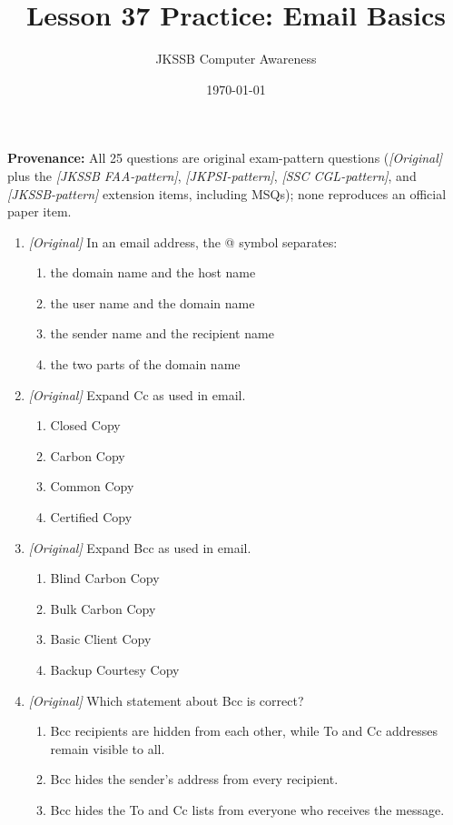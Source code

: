 \documentclass[11pt]{article}
\title{Lesson 37 Practice: Email Basics}
\author{JKSSB Computer Awareness}
\date{\today}
\begin{document}
\maketitle
\noindent\textbf{Provenance:} All 25 questions are original exam-pattern questions (\textit{[Original]} plus the \textit{[JKSSB FAA-pattern]}, \textit{[JKPSI-pattern]}, \textit{[SSC CGL-pattern]}, and \textit{[JKSSB-pattern]} extension items, including MSQs); none reproduces an official paper item.

\begin{enumerate}[label=\textbf{Q\arabic*.}, leftmargin=*]
\item \textit{[Original]} In an email address, the @ symbol separates:
  \begin{enumerate}[label=\Alph*.]
    \item the domain name and the host name
    \item the user name and the domain name
    \item the sender name and the recipient name
    \item the two parts of the domain name
  \end{enumerate}
\item \textit{[Original]} Expand Cc as used in email.
  \begin{enumerate}[label=\Alph*.]
    \item Closed Copy
    \item Carbon Copy
    \item Common Copy
    \item Certified Copy
  \end{enumerate}
\item \textit{[Original]} Expand Bcc as used in email.
  \begin{enumerate}[label=\Alph*.]
    \item Blind Carbon Copy
    \item Bulk Carbon Copy
    \item Basic Client Copy
    \item Backup Courtesy Copy
  \end{enumerate}
\item \textit{[Original]} Which statement about Bcc is correct?
  \begin{enumerate}[label=\Alph*.]
    \item Bcc recipients are hidden from each other, while To and Cc addresses remain visible to all.
    \item Bcc hides the sender's address from every recipient.
    \item Bcc hides the To and Cc lists from everyone who receives the message.

\end{enumerate}
\end{enumerate}
\end{document}
